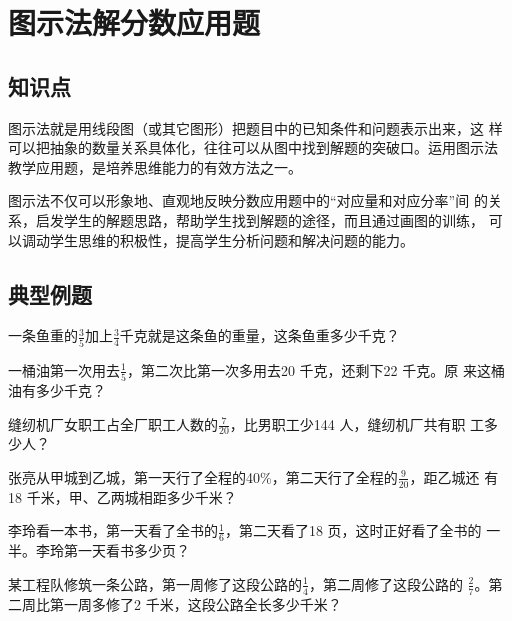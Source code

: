 \chapter{图示法解分数应用题}
\section{知识点}
图示法就是用线段图（或其它图形）把题目中的已知条件和问题表示出来，这
样可以把抽象的数量关系具体化，往往可以从图中找到解题的突破口。运用图示法
教学应用题，是培养思维能力的有效方法之一。\par
图示法不仅可以形象地、直观地反映分数应用题中的“对应量和对应分率”间
的关系，启发学生的解题思路，帮助学生找到解题的途径，而且通过画图的训练，
可以调动学生思维的积极性，提高学生分析问题和解决问题的能力。
\section{典型例题}
\begin{example}
    一条鱼重的$\frac{3}{5}$加上$\frac{3}{4}$千克就是这条鱼的重量，这条鱼重多少千克？
\end{example}
\vspace{2.5cm}
\begin{example}
    一桶油第一次用去$\frac{1}{5}$，第二次比第一次多用去20 千克，还剩下22 千克。原
来这桶油有多少千克？
\end{example}
\vspace{2.5cm}
\begin{example}
    缝纫机厂女职工占全厂职工人数的$\frac{7}{20}$，比男职工少144 人，缝纫机厂共有职
工多少人？
\end{example}
\vspace{2.5cm}
\begin{example}
    张亮从甲城到乙城，第一天行了全程的40\%，第二天行了全程的$\frac{9}{20}$，距乙城还
    有18 千米，甲、乙两城相距多少千米？
\end{example}
\vspace{2.5cm}
\begin{example}
    李玲看一本书，第一天看了全书的$\frac{1}{6}$，第二天看了18 页，这时正好看了全书的
一半。李玲第一天看书多少页？
\end{example}
\vspace{2.5cm}
\begin{example}
    某工程队修筑一条公路，第一周修了这段公路的$\frac{1}{4}$，第二周修了这段公路的
$\frac{2}{7}$。第二周比第一周多修了2 千米，这段公路全长多少千米？
\end{example}
\vspace{2.5cm}
